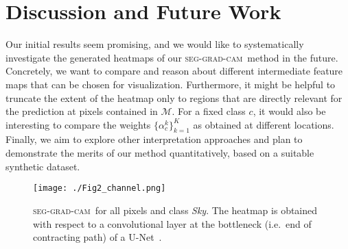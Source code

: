 \documentclass[letterpaper]{article} %
\newcommand{\sgc}{\mbox{\small\textsc{seg-grad-cam}}}
\begin{document}
%
%


\section{Discussion and Future Work}
\label{sec:discussion}

Our initial results seem promising, and we would like to systematically
investigate the generated heatmaps of our \sgc\ method in the future.
%
Concretely, we want to compare and reason about different intermediate feature
maps that can be chosen for visualization.
%
Furthermore, it might be helpful to truncate the extent of the heatmap only
to regions that are directly relevant for the prediction at pixels contained in $\mathcal{M}$.
%
For a fixed class $c$, it would also be interesting to compare the weights $\{\alpha_c^k\}_{k=1}^K$
as obtained at different locations.
%
Finally, we aim to explore other interpretation approaches \cite{montavon2018methods} and plan to demonstrate the merits of our method quantitatively, based on a suitable synthetic dataset.








\begin{figure}[t]
\centering
\texttt{[image: ./Fig2\_channel.png]}%
\caption{%
\sgc\ for all pixels and class \emph{Sky}.
The heatmap is obtained with
respect to a convolutional layer at the bottleneck (i.e.~end of contracting path) of a U-Net~\cite{ronneberger2015u}.
}
\label{fig:example_cityscape2}
\end{figure}




\end{document}

